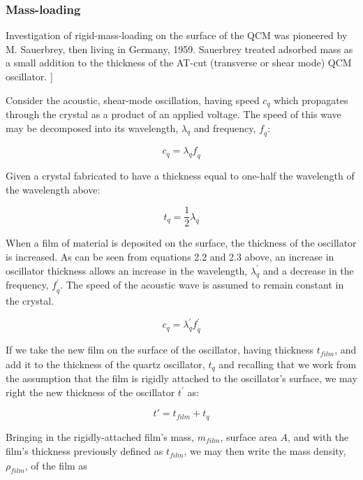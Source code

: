\subsubsection{Mass-loading}

Investigation of rigid-mass-loading on the surface of the QCM was pioneered by M. Sauerbrey, then living in Germany, 1959. Sauerbrey treated adsorbed mass as a small addition to the thickness of the AT-cut (transverse or shear mode) QCM oscillator. \cite{26,27}]

Consider the acoustic, shear-mode oscillation, having speed $\mathit{c_{q}}$ which propagates through the crystal as a product of an applied voltage. The speed of this wave may be decomposed into its wavelength, $\lambda_{q}$ and frequency, $\mathit{f_{q}}$:
	
\begin{equation}
\mathit{c_{q}} = \lambda_{q} \mathit{f_{q}}
\end{equation}
 
Given a crystal fabricated to have a thickness equal to one-half the wavelength of the wavelength above:

\begin{equation}
\mathit{t_{q}} =  \frac{1}{2} \lambda_{q}
\end{equation}

When a film of material is deposited on the surface, the thickness of the oscillator is increased. As can be seen from equations 2.2 and 2.3 above, an increase in oscillator thickness allows an increase in the wavelength, $\lambda_{q}^{'}$ and a decrease in the frequency, $\mathit{f_{q}^{'}}$. The speed of the acoustic wave is assumed to remain constant in the crystal.

\begin{equation}
\mathit{c_{q}} = \lambda_{q}^{'} \mathit{f_{q}^{'}}
\end{equation}

If we take the new film on the surface of the oscillator, having thickness $\mathit{t_{film}}$, and add it to the thickness of the quartz oscillator, $\mathit{t_{q}}$ and recalling that we work from the assumption that the film is rigidly attached to the oscillator's surface, we may right the new thickness of the oscillator $\mathit{t^{'}}$ as:

\begin{equation}
\mathit{t'}= \mathit{t_{film}} + \mathit{t_{q}}
\end{equation}

Bringing in the rigidly-attached film's mass, $\mathit{m_{film}}$, surface area $A$, and with the film's thickness previously defined as $\mathit{t_{film}}$, we may then write the mass density, $\rho_{film}$, of the film as

